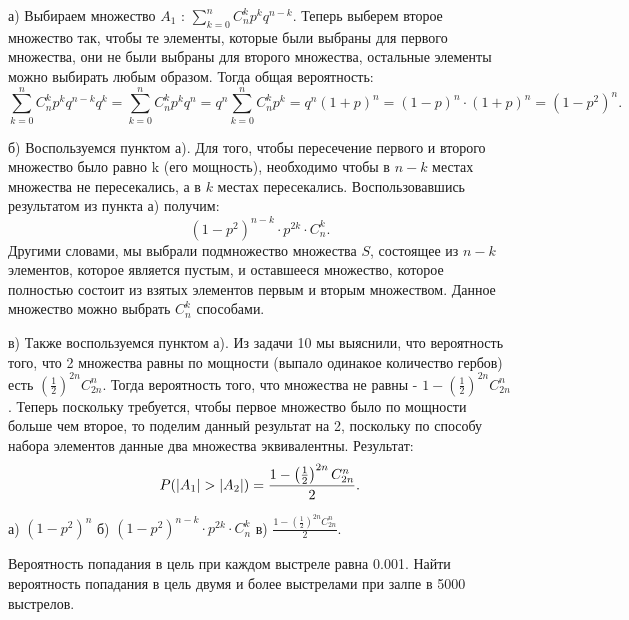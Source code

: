 \begin{subtask}{а)}
 Выбираем множество $A_1$ :  $\sum_{k = 0}^n C_n^k p^k q^{n -k }$. Теперь выберем второе множество так,
 чтобы те элементы, которые были выбраны для первого множества, они не были выбраны для второго множества,
 остальные элементы можно выбирать любым образом.  Тогда общая вероятность:  
 \[
   \sum_{k = 0}^n C_n^k p^k q^{n - k} q^k = \sum_{k = 0}^n C_n^k p^k q^n = q^n \sum_{k = 0}^n C_n^k p^k = q^n (1 + p)^n = (1 - p)^n \cdot (1 + p)^n = (1 - p^2)^n
 .\] 
\end{subtask}


\begin{subtask}{б)}
Воспользуемся пунктом а). Для того, чтобы пересечение первого и второго множество было равно k (его мощность), необходимо чтобы в $n - k$ местах множества
не  пересекались, а в $k$ местах пересекались. Воспользовавшись результатом из пункта а) получим:
\[
  \left(1 - p^2\right)^{n - k} \cdot p^{2k} \cdot C_n^k
.\] Другими словами, мы выбрали подмножество множества $S$, состоящее из $n - k$ элементов, которое является пустым, и оставшееся множество, которое
полностью состоит из взятых элементов первым и вторым множеством. Данное множество можно выбрать $C_n^k$ способами.
\end{subtask}

\begin{subtask}{в)}
Также воспользуемся пунктом а). Из задачи 10 мы выяснили, что вероятность того, что 2 множества равны по мощности (выпало одинакое количество гербов)
есть $\left(\frac{1}{2}\right)^{2n} C_{2n}^n$. Тогда вероятность того, что множества не равны - $1 - \left(\frac{1}{2}\right)^{2n} C_{2n}^n$. Теперь
поскольку требуется, чтобы первое множество было по мощности больше чем второе, то поделим данный результат на 2, поскольку по способу набора элементов
данные два множества эквивалентны. Результат: 
\[
  P(\left\lvert A_1\right\rvert > \left\lvert A_2\right\rvert) = \frac{1 - \left(\frac{1}{2}\right)^{2n} C_{2n}^n}{2}
.\] 
\end{subtask}

\begin{result}
а) $(1 - p^2)^n$ б) $\left(1 - p^2\right)^{n - k} \cdot p^{2k} \cdot C_n^k$ в) $\frac{1 - \left(\frac{1}{2}\right)^{2n} C_{2n}^n}{2}$.
\end{result}


\begin{task}{19}
Вероятность попадания в цель при каждом выстреле равна 0.001. Найти вероятность попадания в цель 
двумя и более выстрелами при залпе в 5000 выстрелов.
\end{task}

